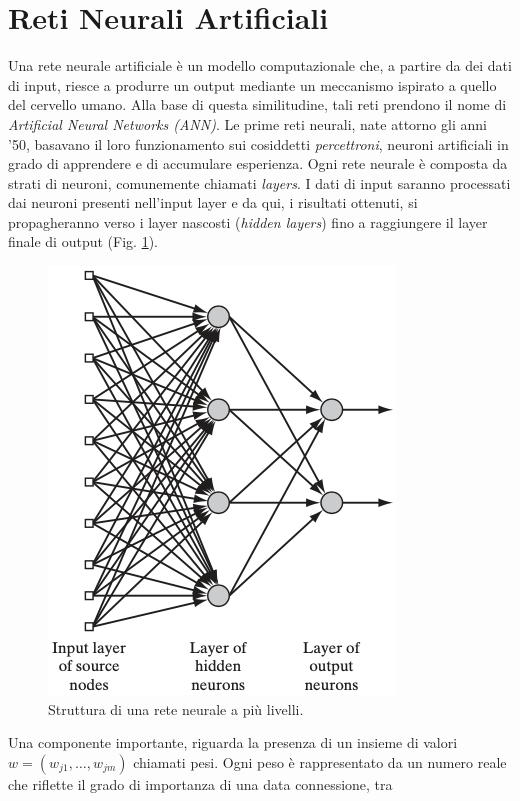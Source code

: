 \section{Reti Neurali Artificiali}\label{Reti neurali}
Una rete neurale artificiale è un modello computazionale che, a partire da 
dei dati di input, riesce a produrre un output mediante un meccanismo 
ispirato a quello del cervello umano. Alla base di questa similitudine, 
tali reti prendono il nome di \emph{Artificial Neural Networks (ANN)}. Le prime 
reti neurali, nate attorno gli anni '50, basavano il loro funzionamento 
sui cosiddetti \emph{percettroni}, neuroni artificiali in grado di apprendere e di 
accumulare esperienza. Ogni rete neurale è composta da strati di neuroni, 
comunemente chiamati \emph{layers}. I dati di input saranno processati dai neuroni 
presenti nell'input layer e da qui, i risultati ottenuti, si propagheranno verso 
i layer nascosti (\emph{hidden layers}) fino a raggiungere il layer finale di output 
(Fig. \ref{network structure}).
\begin{figure}
    \centering
    \includegraphics[width = 0.6 \linewidth]{images/netwrok structure.png}
    \centering
    \caption{Struttura di una rete neurale a più livelli.}
    \label{network structure}
\end{figure}
Una componente importante, riguarda la presenza di un insieme 
di valori $w=(w_{j1}, \dots, w_{jm})$ chiamati pesi. Ogni peso è rappresentato da un 
numero reale che riflette il grado di importanza di una data connessione, tra 
